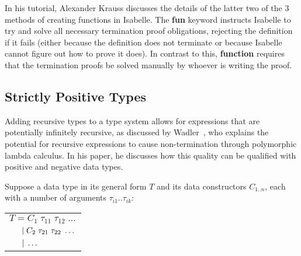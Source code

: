 In his tutorial\citep{KraussIsabelle}, Alexander Krauss discusses the details of the latter two of the 3 methods
of creating functions in Isabelle. The \textbf{fun} keyword instructs Isabelle to try and solve all necessary
termination proof obligations, rejecting the definition if it fails (either because the definition does not 
terminate or because Isabelle cannot figure out how to prove it does). In contrast to this, \textbf{function}
requires that the termination proofs be solved manually by whoever is writing the proof.



\subsection{Strictly Positive Types}


Adding recursive types to a type system allows for expressions that are potentially infinitely recursive,
as discussed by Wadler~\cite{RecursiveTypesForFree}, who explains the potential for recursive expressions
to cause non-termination through polymorphic lambda calculus. In his paper, he discusses how this
quality can be qualified with positive and negative data types.

Suppose a data type in its general form $T$ and its data constructors $C_{1..n}$, each with a number of arguments 
$\tau_{i1}..\tau_{ik}$:

\begin{center}
    \begin{tabular}{l}
        $T = C_1\; \tau_{11} \; \tau_{12} \; \dots$ \\
        $\hspace{1.5em} \vert\; C_2\; \tau_{21} \; \tau_{22} \; \dots$ \\
        $\hspace{1.5em} \vert\; \dots$ \\
    \end{tabular} 
\end{center}

